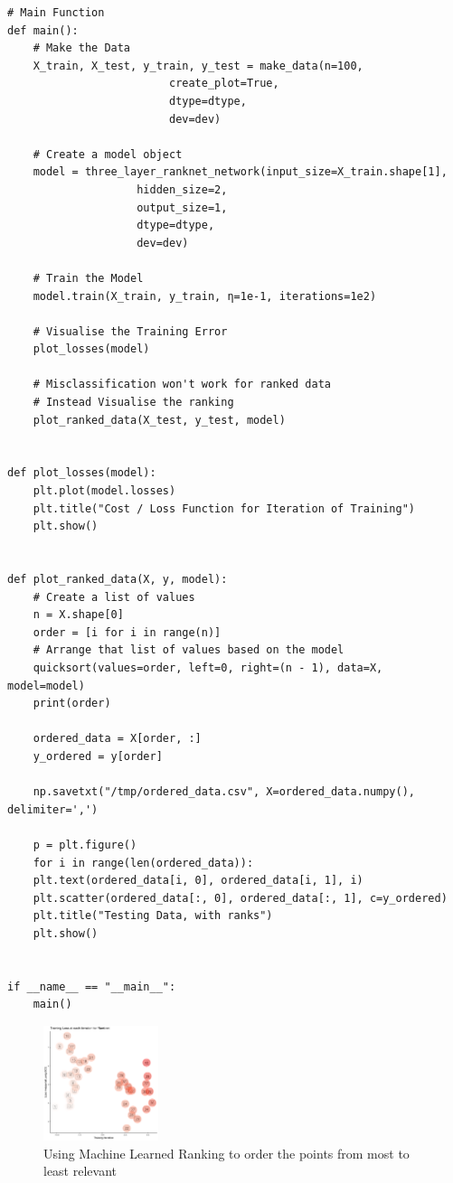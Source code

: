 \documentclass[a4paper,11pt,twoside]{article}
\begin{document}
\begin{verbatim}
# Main Function
def main():
    # Make the Data
    X_train, X_test, y_train, y_test = make_data(n=100,
						 create_plot=True,
						 dtype=dtype,
						 dev=dev)

    # Create a model object
    model = three_layer_ranknet_network(input_size=X_train.shape[1],
					hidden_size=2,
					output_size=1,
					dtype=dtype,
					dev=dev)

    # Train the Model
    model.train(X_train, y_train, η=1e-1, iterations=1e2)

    # Visualise the Training Error
    plot_losses(model)

    # Misclassification won't work for ranked data
    # Instead Visualise the ranking
    plot_ranked_data(X_test, y_test, model)


def plot_losses(model):
    plt.plot(model.losses)
    plt.title("Cost / Loss Function for Iteration of Training")
    plt.show()


def plot_ranked_data(X, y, model):
    # Create a list of values
    n = X.shape[0]
    order = [i for i in range(n)]
    # Arrange that list of values based on the model
    quicksort(values=order, left=0, right=(n - 1), data=X, model=model)
    print(order)

    ordered_data = X[order, :]
    y_ordered = y[order]

    np.savetxt("/tmp/ordered_data.csv", X=ordered_data.numpy(), delimiter=',')

    p = plt.figure()
    for i in range(len(ordered_data)):
	plt.text(ordered_data[i, 0], ordered_data[i, 1], i)
    plt.scatter(ordered_data[:, 0], ordered_data[:, 1], c=y_ordered)
    plt.title("Testing Data, with ranks")
    plt.show()


if __name__ == "__main__":
    main()
\end{verbatim}


\begin{figure}[htbp]
\centering
\includegraphics[width=0.3\textwidth]{media/ordered_blobs.png}
\caption{\label{fig:orgb3f5d3d}Using Machine Learned Ranking to order the points from most to least relevant}
\end{figure}
\end{document}
